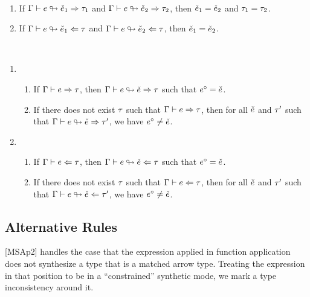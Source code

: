 \documentclass{article}
\begin{document}
\begin{theorem}[name=Unicity] \
  \begin{enumerate}
    \item If $\Gamma \vdash e \looparrowright \check{e}_1 \Rightarrow \tau_1$ and
      $\Gamma \vdash e \looparrowright \check{e}_2 \Rightarrow \tau_2$, then $\check{e}_1 = \check{e}_2$ and $\tau_1 =
      \tau_2$.
    \item If $\Gamma \vdash e \looparrowright \check{e}_1 \Leftarrow \tau$ and
      $\Gamma \vdash e \looparrowright \check{e}_2 \Leftarrow \tau$, then $\check{e}_1 = \check{e}_2$.
  \end{enumerate}
\end{theorem}

\begin{theorem}[name=?] \
  \begin{enumerate}
    \item \begin{enumerate}
        \item If $\Gamma \vdash e \Rightarrow \tau$, then $\Gamma \vdash e \looparrowright \check{e} \Rightarrow \tau$
          such that $e^{\circ} = \check{e}$.
        \item If there does not exist $\tau$ such that $\Gamma \vdash e \Rightarrow \tau$, then for all
          $\check{e}$ and $\tau'$ such that $\Gamma \vdash e \looparrowright \check{e} \Rightarrow \tau'$, we have
          $e^{\circ} \neq \check{e}$.
      \end{enumerate}

    \item \begin{enumerate}
        \item If $\Gamma \vdash e \Leftarrow \tau$, then $\Gamma \vdash e \looparrowright \check{e} \Leftarrow \tau$
          such that $e^{\circ} = \check{e}$.
        \item If there does not exist $\tau$ such that $\Gamma \vdash e \Leftarrow \tau$, then for all
          $\check{e}$ and $\tau'$ such that $\Gamma \vdash e \looparrowright \check{e} \Leftarrow \tau'$, we have
          $e^{\circ} \neq \check{e}$.
      \end{enumerate}
  \end{enumerate}
\end{theorem}

\subsection{Alternative Rules}
[MSAp2] handles the case that the expression applied in function application does not synthesize a
type that is a matched arrow type. Treating the expression in that position to be in a
``constrained'' synthetic mode, we mark a type inconsistency around it.
\end{document}
